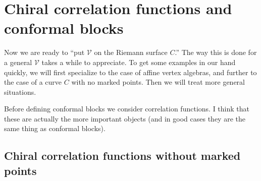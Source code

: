 \documentclass[12pt,letterpaper,reqno]{amsart}
\numberwithin{equation}{section}
\newcommand{\vertex}{\mathcal{V}}
\begin{document}
\section{Chiral correlation functions and conformal blocks}

Now we are ready to ``put $\vertex$ on the Riemann surface $C$.''
The way this is done for a general $\vertex$ takes a while
to appreciate. To get some examples in our hand quickly, 
we will first specialize to the case of affine vertex algebras,
and further to the case of a curve $C$ with no marked points.
Then we will treat more general situations.

Before defining conformal blocks we consider correlation functions.
I think that these are actually the more important objects (and in good
cases they are the same thing as conformal blocks).


\subsection{Chiral correlation functions without marked points}
\end{document}

